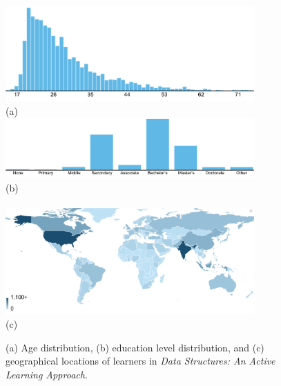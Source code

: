 \begin{figure}
\centering
\includegraphics[width=0.85\textwidth]{figs/education-data-structures-learner-ages}\\
(a)\\
\includegraphics[width=0.85\textwidth]{figs/education-data-structures-learner-education-levels}\\
(b)\\~\\
\includegraphics[width=0.85\textwidth]{figs/education-data-structures-learner-country}\\
(c)\\
\caption[Learner Demographics]
{(a) Age distribution, (b) education level distribution, and (c) geographical locations of learners in \textit{Data Structures: An Active Learning Approach}.}
\label{fig:education-learner-demographics}
\end{figure}

